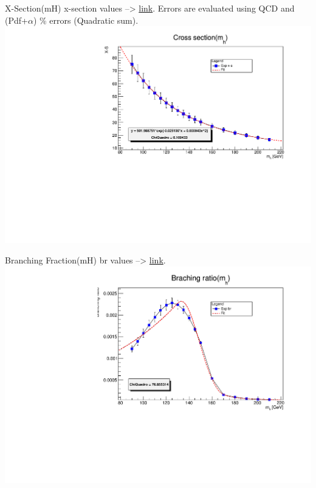 \documentclass[10pt,UKenglish, leqno, xcolor = dvipsnames]{beamer}
\begin{document}
		\begin{frame}{X-Section(mH)}
			x-section values --> \href{https://twiki.cern.ch/twiki/bin/view/LHCPhysics/CERNYellowReportPageBSMAt13TeV}{link}. Errors are evaluated using QCD and (Pdf+$\alpha$) \% errors (Quadratic sum).
			\vfill
			\centering
			\includegraphics[width=.9\textwidth]{../images/x_section_fit.pdf}
			\vfill
		\end{frame}
	
		\begin{frame}{Branching Fraction(mH)}
			br values --> \href{https://arxiv.org/abs/1307.1347}{link}. 
			\vfill
			\centering
			\includegraphics[width=.9\textwidth]{../images/br_fit_1.pdf}
			\vfill
		\end{frame}
	
\end{document}
